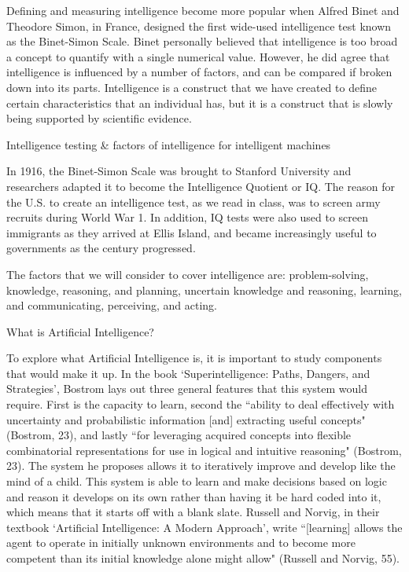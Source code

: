 \documentclass[11pt]{article}
\begin{document}
\par Defining and measuring intelligence become more popular when Alfred Binet and Theodore Simon, in France, designed the first wide-used intelligence test known as the Binet-Simon Scale. Binet personally believed that intelligence is too broad a concept to quantify with a single numerical value. However, he did agree that intelligence is influenced by a number of factors, and can be compared if broken down into its parts. Intelligence is a construct that we have created to define certain characteristics that an individual has, but it is a construct that is slowly being supported by scientific evidence.

\begin{center}
	{\large Intelligence testing \& factors of intelligence for intelligent machines\par}
\end{center}

\par In 1916, the Binet-Simon Scale was brought to Stanford University and researchers adapted it to become the Intelligence Quotient or IQ. The reason for the U.S. to create an intelligence test, as we read in class, was to screen army recruits during World War 1. In addition, IQ tests were also used to screen immigrants as they arrived at Ellis Island, and became increasingly useful to governments as the century progressed. 

\par The factors that we will consider to cover intelligence are: problem-solving, knowledge, reasoning, and planning, uncertain knowledge and reasoning, learning, and communicating, perceiving, and acting.


\begin{center}
	{\large What is Artificial Intelligence?\par}
\end{center}
\par To explore what Artificial Intelligence is, it is important to study components that would make it up. In the book `Superintelligence: Paths, Dangers, and Strategies', Bostrom lays out three general features that this system would require. First is the capacity to learn, second the ``ability to deal effectively with uncertainty and probabilistic information [and] extracting useful concepts" (Bostrom, 23), and lastly ``for leveraging acquired concepts into flexible combinatorial representations for use in logical and intuitive reasoning" (Bostrom, 23). The system he proposes allows it to iteratively improve and develop like the mind of a child. This system is able to learn and make decisions based on logic and reason it develops on its own rather than having it be hard coded into it, which means that it starts off with a blank slate. Russell and Norvig, in their textbook `Artificial Intelligence: A Modern Approach', write ``[learning] allows the agent to operate in initially unknown environments and to become more competent than its initial knowledge alone might allow" (Russell and Norvig, 55).
\end{document}
